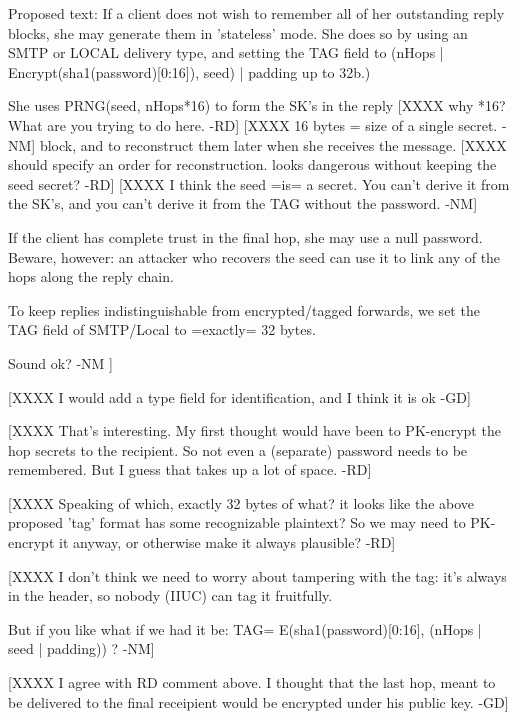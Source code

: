       Proposed text:
         If a client does not wish to remember all of her outstanding
         reply blocks, she may generate them in 'stateless' mode.  She  
         does so by using an SMTP or LOCAL delivery type, and setting
         the TAG field to 
           (nHops | Encrypt(sha1(password)[0:16]), seed) | padding up to 32b.)

         She uses PRNG(seed, nHops*16) to form the SK's in the reply
[XXXX why *16? What are you trying to do here. -RD]
[XXXX 16 bytes = size of a single secret. -NM]
         block, and to reconstruct them later when she receives the 
         message.
[XXXX should specify an order for reconstruction. looks dangerous
  without keeping the seed secret? -RD]
[XXXX I think the seed =is= a secret.  You can't derive it from the
  SK's, and you can't derive it from the TAG without the password. -NM]
       
         If the client has complete trust in the final hop, she may
         use a null password.  Beware, however: an attacker who recovers 
         the seed can use it to link any of the hops along the reply 
         chain.

	 To keep replies indistinguishable from encrypted/tagged
         forwards, we set the TAG field of SMTP/Local to =exactly=
         32 bytes.

         Sound ok?                                 -NM ]

[XXXX I would add a type field for identification, and I think it is
ok -GD]

[XXXX That's interesting. My first thought would have been to PK-encrypt
      the hop secrets to the recipient. So not even a (separate) password
      needs to be remembered. But I guess that takes up a lot of
      space. -RD]

[XXXX Speaking of which, exactly 32 bytes of what? it looks like the
      above proposed 'tag' format has some recognizable plaintext? So
      we may need to PK-encrypt it anyway, or otherwise make it always
      plausible? -RD]

[XXXX I don't think we need to worry about tampering with the tag:
      it's always in the header, so nobody (IIUC) can tag it fruitfully.

      But if you like what if we had it be:
        TAG= E(sha1(password)[0:16],  (nHops | seed | padding)) ? -NM]

[XXXX I agree with RD comment above.  I thought that the last hop, meant
 to be delivered to the final receipient would be encrypted under his public 
 key. -GD]

